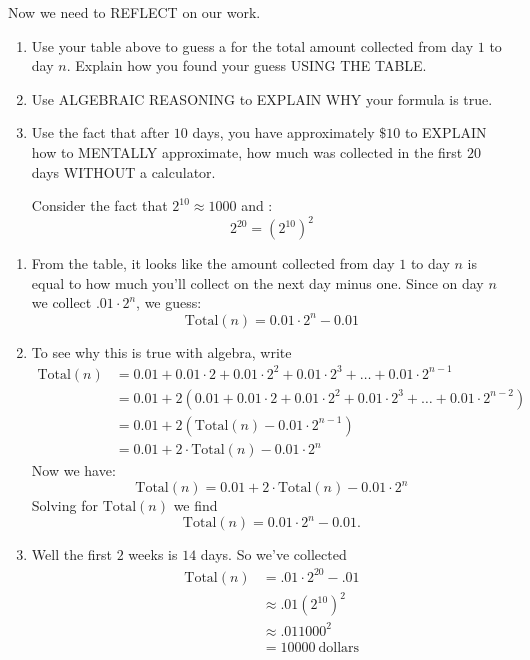 \documentclass[nooutcomes,noauthor,hints]{ximera}
\begin{document}
\begin{question}
  Now we need to REFLECT on our work.
  \begin{enumerate}
    \item Use your table above to guess a for the total amount
      collected from day $1$ to day $n$. Explain how you found your
      guess USING THE TABLE.
    \item Use ALGEBRAIC REASONING to EXPLAIN WHY your formula is true.
    \item Use the fact that after $10$ days, you have approximately
      $\$10$ to EXPLAIN how to MENTALLY approximate, how much was
      collected in the first $20$ days WITHOUT a calculator.
      \begin{hint}
        Consider the fact that $2^10 \approx 1000$ and :
        \[
        2^{20} = \left(2^10\right)^2
        \]
      \end{hint}
  \end{enumerate}
  \begin{freeResponse}
    \begin{enumerate}
      \item From the table, it looks like the amount collected from
        day $1$ to day $n$ is equal to how much you'll collect on the
        next day minus one. Since on day $n$ we collect $.01\cdot
        2^n$, we guess:
        \[
        \mathrm{Total}(n) = 0.01\cdot 2^{n} -0.01
        \]
      \item To see why this is true with algebra, write
        \begin{align*}
        \mathrm{Total}(n) &= 0.01 +0.01\cdot 2+0.01\cdot 2^2 +0.01 \cdot 2^3 + \dots + 0.01 \cdot 2^{n-1}\\
        &= 0.01 + 2 ( 0.01 +0.01\cdot 2+0.01\cdot 2^2 +0.01 \cdot 2^3 + \dots + 0.01 \cdot 2^{n-2})\\
        &= 0.01 + 2 ( \mathrm{Total}(n) - 0.01\cdot 2^{n-1})\\
        &= 0.01 + 2\cdot\mathrm{Total}(n) - 0.01\cdot 2^{n}
        \end{align*}
        Now we have:
        \[
        \mathrm{Total}(n)= 0.01 + 2\cdot\mathrm{Total}(n) - 0.01\cdot 2^{n}
        \]
    Solving for $\mathrm{Total}(n)$ we find
    \[
    \mathrm{Total}(n) = 0.01\cdot 2^{n} -0.01.
    \]
  \item Well the first $2$ weeks is $14$ days. So we've collected 
    \begin{align*}
      \mathrm{Total}(n) &= .01\cdot 2^20 - .01\\
        &\approx .01 \left(2^10\right)^2 \\
        &\approx .01 1000^2 \\
        &= 10000~\text{dollars} 
    \end{align*}
    \end{enumerate}
  \end{freeResponse}
\end{question}
\end{document}
